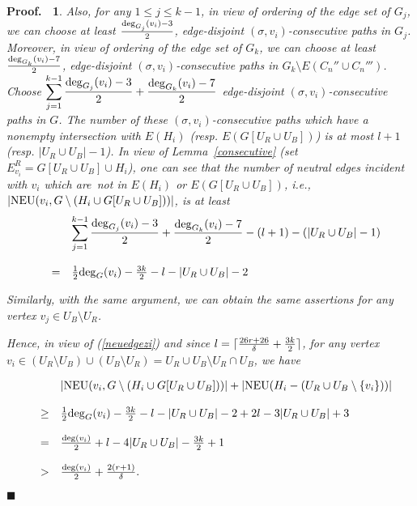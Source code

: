 \documentclass[11pt]{article}
\newtheorem{preproof}{{\bf Proof.\ }}
\newenvironment{proof}[1]{\begin{preproof}{\rm
               #1}\hfill{$\blacksquare$}}{\end{preproof}}
\begin{document}
\begin{proof}
{Also, for any $1\leq j \leq k-1$, in view of ordering of the edge set of 
$G_j$, we can choose at least 
${{\rm deg}_{G_j}(v_i)-3\over 2}$, edge-disjoint $(\sigma,v_i)$-consecutive paths in $G_j$. 
Moreover, in view of ordering of the edge set of 
$G_k$, we can choose at least ${{\rm deg}_{G_k}(v_i)-7\over 2}$, edge-disjoint $(\sigma,v_i)$-consecutive paths in 
$G_k\setminus E(C_n''\cup C_n''')$. Choose  
$\displaystyle\sum_{j=1}^{k-1}{{\rm deg}_{G_j}(v_i)-3\over 2}+{{\rm deg}_{G_k}(v_i)-7\over 2}$ edge-disjoint $(\sigma,v_i)$-consecutive paths in $G$. 
The number of these $(\sigma,v_i)$-consecutive paths which 
have a nonempty intersection with $E(H_i)$ (resp. $E(G[U_R\cup U_B])$) is at most $l+1$ (resp. $|U_R\cup U_B|-1$). 
In view of Lemma~\ref{consecutive} (set $E_{v_i}^R=G[U_R\cup U_B]\cup H_i$), one can see that the number of neutral edges incident with $v_i$ which are~not in $E(H_i)$ or $E(G[U_R\cup U_B])$, i.e., $|{\rm NEU}(v_i, G\setminus (H_i\cup G[U_R\cup U_B]))|$, is at least 
$$\begin{array}{rll}
 &  & \displaystyle\sum_{j=1}^{k-1}{{\rm deg}_{G_j}(v_i)-3\over 2}+{{\rm deg}_{G_k}(v_i)-7\over 2}-(l+1)-(|U_R\cup U_B|-1)\\
&& \\
 & = & {1\over 2}{\rm deg}_G(v_i)-{3k\over 2}-l-|U_R\cup U_B|-2
\end{array}$$

Similarly, with the same argument, we can obtain the same assertions for any vertex $v_j\in U_B\setminus U_R$. 

Hence, in view of (\ref{neuedgezi}) and since $l=\lceil {26r+26\over \delta}+{3k\over 2}\rceil$, for any vertex $v_i\in (U_R\setminus U_B)\cup(U_B\setminus U_R)=U_R\cup U_B\setminus U_R\cap U_B$, we have 

$$\begin{array}{rll}
& &  |{\rm NEU}(v_i, G\setminus (H_i\cup G[U_R\cup U_B]))|+|{\rm NEU}(H_i-(U_R\cup U_B\setminus\{v_i\}))| \\
&&\\
 & \geq  &{1\over 2}{\rm deg}_G(v_i)-{3k\over 2}-l-|U_R\cup U_B|-2+ 2l-3|U_R\cup U_B|+3\\
&&\\
 & = & {{\rm deg}(v_i)\over 2}+l-4|U_R\cup U_B|-{3k\over 2}+1\\
 &&\\
 & > &  {{\rm deg}(v_i)\over 2}+{2(r+1)\over \delta}.
\end{array}
$$

}
\end{proof}
\end{document}
